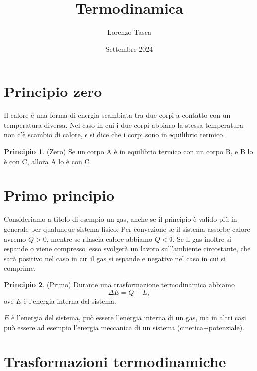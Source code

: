 \documentclass{article}
\title{Termodinamica}
\author{Lorenzo Tasca}
\date{Settembre 2024}
\theoremstyle{definition}
\newtheorem*{principle}{Principio}
\begin{document}
\maketitle

\section{Principio zero}

Il calore è una forma di energia scambiata tra due corpi a contatto con un temperatura diversa. Nel caso in cui i due corpi abbiano la stessa temperatura non c'è scambio di calore, e si dice che i corpi sono in equilibrio termico. 
\begin{principle}
(Zero) Se un corpo A è in equilibrio termico con un corpo B, e B lo è con C, allora A lo è con C. 
\end{principle}

\section{Primo principio}

Consideriamo a titolo di esempio un gas, anche se il principio è valido più in generale per qualunque sistema fisico. Per convezione se il sistema assorbe calore avremo $Q>0$, mentre se rilascia calore abbiamo $Q<0$. Se il gas inoltre si espande o viene compresso, esso svolgerà un lavoro sull'ambiente circostante, che sarà positivo nel caso in cui il gas si espande e negativo nel caso in cui si comprime. 

\begin{principle}
    (Primo) Durante una trasformazione termodinamica abbiamo $$\Delta E=Q-L,$$ ove $E$ è l'energia interna del sistema. 
\end{principle}

$E$ è l'energia del sistema, può essere l'energia interna di un gas, ma in altri casi può essere ad esempio l'energia meccanica di un sistema (cinetica+potenziale).

\section{Trasformazioni termodinamiche}
\end{document}
